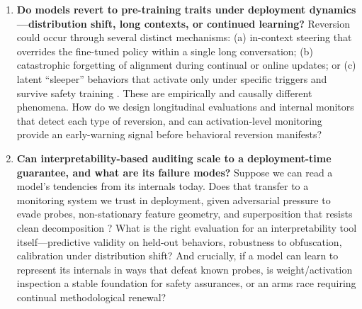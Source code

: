 \documentclass[11pt]{article}
\begin{document}
\begin{enumerate}[leftmargin=*,label=\textbf{Q\arabic*.}]
\item \textbf{Do models revert to pre-training traits under deployment dynamics---distribution shift, long contexts, or continued learning?}
Reversion could occur through several distinct mechanisms: (a) in-context steering that overrides the fine-tuned policy within a single long conversation; (b) catastrophic forgetting of alignment during continual or online updates; or (c) latent ``sleeper'' behaviors that activate only under specific triggers and survive safety training \citep{hubinger2024sleeper}. These are empirically and causally different phenomena. How do we design longitudinal evaluations and internal monitors that detect each type of reversion, and can activation-level monitoring provide an early-warning signal before behavioral reversion manifests?

\item \textbf{Can interpretability-based auditing scale to a deployment-time guarantee, and what are its failure modes?}
Suppose we can read a model's tendencies from its internals today. Does that transfer to a monitoring system we trust in deployment, given adversarial pressure to evade probes, non-stationary feature geometry, and superposition that resists clean decomposition \citep{cunningham2023sparse,templeton2024scaling}? What is the right evaluation for an interpretability tool itself---predictive validity on held-out behaviors, robustness to obfuscation, calibration under distribution shift? And crucially, if a model can learn to represent its internals in ways that defeat known probes, is weight/activation inspection a stable foundation for safety assurances, or an arms race requiring continual methodological renewal?

\end{enumerate}
\end{document}
